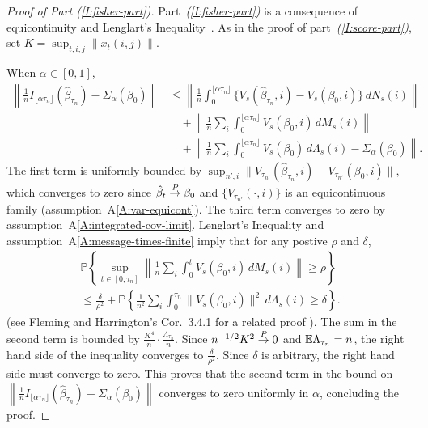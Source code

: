 \documentclass[aoas,preprint]{imsart}
\begin{document}
\begin{proof}[Proof of Part \textit{(\ref{I:fisher-part})}]
Part~\textit{(\ref{I:fisher-part})} is a consequence of equicontinuity
and Lenglart's Inequality~\cite{lenglart1977relation}.  As in the proof of
part~\textit{(\ref{I:score-part})}, set $K = \sup_{t,i,j} \| x_t(i,j) \|$.

When $\alpha \in [0, 1]$,
\begin{align*}
    \left\|
        \tfrac{1}{n} I_{\lfloor \alpha \tau_n \rfloor}(\hat \beta_{\tau_n})
        -
        \Sigma_{\alpha} (\beta_0)
    \right\|
        &\leq
        \left\|
            \frac{1}{n}
            \int_0^{\lfloor \alpha \tau_n \rfloor}
                \{
                    V_s(\hat \beta_{\tau_n}, i)
                    -
                    V_s(\beta_0, i)
                \} \, dN_s(i)
        \right\| \\
        &\quad+
        \left\|
            \frac{1}{n}
            \sum_i
            \int_0^{\lfloor \alpha \tau_n \rfloor}
                V_s(\beta_0, i) \, dM_s(i)
        \right\| \\
        &\quad+
        \left\|
            \frac{1}{n}
            \sum_i
            \int_0^{\lfloor \alpha \tau_n \rfloor}
                V_s(\beta_0)
                \, d\Lambda_s(i)
            -
            \Sigma_{\alpha}(\beta_0)
        \right\|.
\end{align*}
The first term is uniformly bounded by 
\(
    \sup_{n',i}
        \|
            V_{\tau_{n'}}(\hat \beta_{\tau_n}, i)
            -
            V_{\tau_{n'}}(\beta_0, i)
        \|,
\)
which converges to zero since $\hat \beta_t \overset{\mathit{P}}{\to} \beta_0$ and
$\{ V_{\tau_{n'}}(\cdot, i) \}$ is an equicontinuous family
(assumption~A\ref{A:var-equicont}).
The third term converges to zero by assumption~A\ref{A:integrated-cov-limit}.
Lenglart's Inequality and assumption~A\ref{A:message-times-finite} imply that for
any postive $\rho$ and $\delta$,
\begin{multline*}
    \mathbb{P}\left\{
        \sup_{t \in [0,\tau_n]}
        \left\|
            \frac{1}{n}
            \sum_{i}
            \int_{0}^{t}
                V_s(\beta_0, i) \, dM_s(i)
        \right\|
        \geq \rho
    \right\} \\
    \leq
    \frac{\delta}{\rho^2}
    +
    \mathbb{P}\left\{
        \frac{1}{n^2}
        \sum_{i}
        \int_{0}^{\tau_n}
            \| V_s (\beta_0, i) \|^2
            \, d\Lambda_s(i)
        \geq
        \delta
    \right\}.
\end{multline*}
(see Fleming and Harrington's Cor.~3.4.1 for a related proof
\cite{fleming1991counting}).  The sum in the second term is bounded by
$\frac{K^4}{n} \cdot \frac{\Lambda_{\tau_n}}{n}$.  Since $n^{-1/2} K^2 \overset{\mathit{P}}{\to} 0$
and $\mathbb{E} \Lambda_{\tau_n} = n$, the right hand side of the inequality converges
to $\frac{\delta}{\rho^2}$.  Since $\delta$ is arbitrary, the right hand side
must converge to zero.  This proves that the second term in the bound on
\(
    \left\|
        \tfrac{1}{n} I_{\lfloor \alpha \tau_n \rfloor}(\hat \beta_{\tau_n})
        -
        \Sigma_{\alpha} (\beta_0)
    \right\|
\)
converges to zero uniformly in $\alpha$, concluding the proof.
\end{proof}
\end{document}
